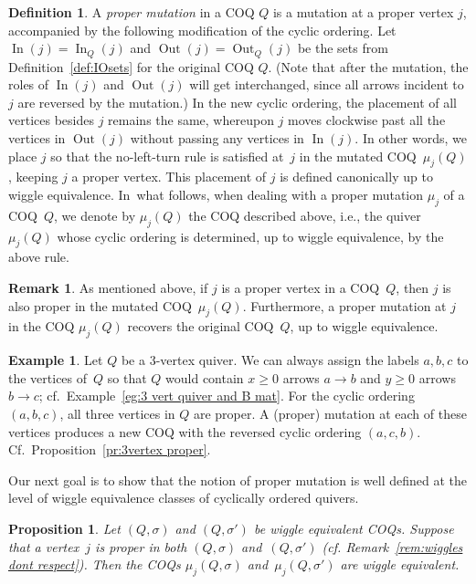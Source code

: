 \documentclass[11pt, letterpaper]{amsart}
\newtheorem{proposition}[theorem]{Proposition}
\theoremstyle{definition}
\newtheorem{remark}[theorem]{Remark}
\newtheorem{example}[theorem]{Example}
\newtheorem{definition}[theorem]{Definition}
\numberwithin{equation}{section}
\def\In{{\operatorname{In}}}
\def\Out{{\operatorname{Out}}}
\begin{document}
\begin{definition}
\label{def:proper mutation}
 A \emph{proper mutation} in a COQ $Q$ is a mutation at a proper vertex $j$, accompanied by the following modification of the cyclic ordering. 
 Let $\In(j)=\In_Q(j)$ and $\Out(j)=\Out_Q(j)$ be the sets from Definition~\ref{def:IOsets} for the original COQ $Q$. 
 (Note that after the mutation, the roles of $\In(j)$ and $\Out(j)$ will get interchanged, since all arrows incident to $j$ are reversed by the mutation.) 
 In the new cyclic ordering, the placement of all vertices besides $j$ remains the same, whereupon $j$ moves clockwise past all the vertices in $\Out(j)$ without passing any vertices in $\In(j)$. 
 In other words, we place $j$ so that the no-left-turn rule is satisfied at~$j$ in the mutated COQ~$\mu_j(Q)$, 
 keeping $j$ a proper vertex. 
 This placement of $j$ is defined canonically up to wiggle equivalence. 
 In~what follows, when dealing with a proper mutation $\mu_j$ of a COQ~$Q$,
 we denote by $\mu_j(Q)$ the COQ described above, i.e., the quiver $\mu_j(Q)$ whose cyclic ordering is determined,
 up to wiggle equivalence, by the above rule. 
\end{definition}

\begin{remark}
\label{rem:proper mutation involution}
As mentioned above, if $j$ is a proper vertex in a COQ~$Q$, then $j$ is also proper in the mutated COQ~$\mu_j(Q)$. 
Furthermore, a proper mutation at $j$ in the COQ $\mu_j(Q)$ recovers the original COQ~$Q$,
up to wiggle equivalence.
\end{remark}

\begin{example}
\label{eg:3-vert-always-proper}
Let $Q$ be a 3-vertex quiver. 
We can always assign the labels $a, b, c$ to the vertices of~$Q$ so that 
$Q$ would contain $x\ge0$ arrows $a \rightarrow b$
 and $y\ge0$ arrows $b \rightarrow c$; cf.\ Example~\ref{eg:3 vert quiver and B mat}.  
 For the cyclic ordering $(a,b,c)$, all three vertices in $Q$ are proper. 
 A (proper) mutation at each of these vertices produces a new COQ with the reversed cyclic ordering $(a,c,b)$. 
Cf.\ Proposition~\ref{pr:3vertex proper}. 
\end{example}

Our next goal is to show that the notion of proper mutation is well defined 
at the level of wiggle equivalence classes of cyclically ordered quivers.

\begin{proposition}
\label{prop:proper mutation for wiggle equivalent}
 Let $(Q,\sigma)$ and $(Q,\sigma')$ be wiggle equivalent COQs. 
Suppose that a vertex~$j$ is proper in both $(Q,\sigma)$ and~$(Q,\sigma')$ 
(cf. Remark~\ref{rem:wiggles dont respect}).
Then the COQs $\mu_j(Q,\sigma)$ and~$\mu_j(Q,\sigma')$ are wiggle equivalent. 
\end{proposition}
\end{document}
